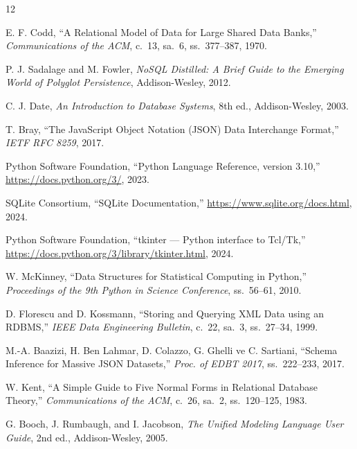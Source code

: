 \documentclass[conference,a4paper,10pt]{IEEEtran}
\begin{document}
\begin{thebibliography}{12}

E. F. Codd, ``A Relational Model of Data for Large Shared Data Banks,''
\textit{Communications of the ACM}, c.~13, sa.~6, ss.~377--387, 1970.

P. J. Sadalage and M. Fowler,
\textit{NoSQL Distilled: A Brief Guide to the Emerging World of Polyglot Persistence},
Addison-Wesley, 2012.

C. J. Date, \textit{An Introduction to Database Systems}, 8th ed.,
Addison-Wesley, 2003.

T. Bray, ``The JavaScript Object Notation (JSON) Data Interchange Format,''
\textit{IETF RFC 8259}, 2017.

Python Software Foundation, ``Python Language Reference, version 3.10,''
\url{https://docs.python.org/3/}, 2023.

SQLite Consortium, ``SQLite Documentation,''
\url{https://www.sqlite.org/docs.html}, 2024.

Python Software Foundation, ``tkinter --- Python interface to Tcl/Tk,''
\url{https://docs.python.org/3/library/tkinter.html}, 2024.

W. McKinney, ``Data Structures for Statistical Computing in Python,''
\textit{Proceedings of the 9th Python in Science Conference}, ss.~56--61, 2010.

D. Florescu and D. Kossmann, ``Storing and Querying XML Data using an RDBMS,''
\textit{IEEE Data Engineering Bulletin}, c.~22, sa.~3, ss.~27--34, 1999.

M.-A. Baazizi, H. Ben Lahmar, D. Colazzo, G. Ghelli ve C. Sartiani,
``Schema Inference for Massive JSON Datasets,''
\textit{Proc. of EDBT 2017}, ss.~222--233, 2017.

W. Kent, ``A Simple Guide to Five Normal Forms in Relational Database Theory,''
\textit{Communications of the ACM}, c.~26, sa.~2, ss.~120--125, 1983.

G. Booch, J. Rumbaugh, and I. Jacobson,
\textit{The Unified Modeling Language User Guide}, 2nd ed.,
Addison-Wesley, 2005.

\end{thebibliography}
\end{document}
